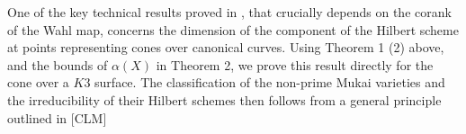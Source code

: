 \documentclass[11pt,twoside]{amsart}
\theoremstyle{plain}
\numberwithin{equation}{section}
\theoremstyle{definition}
\begin{document}
One of the key technical results proved in \cite{CLM98}, that crucially depends on the corank of the Wahl map, concerns the dimension of the component of the Hilbert scheme at points representing cones over canonical curves. Using Theorem 1 (2) above, and the bounds of $\alpha(X)$ in Theorem 2, we prove this result directly for the cone over a $K3$ surface. The classification of the non-prime Mukai varieties and the irreducibility of their Hilbert schemes then follows from a general principle outlined in [CLM] 

\smallskip

\end{document}
